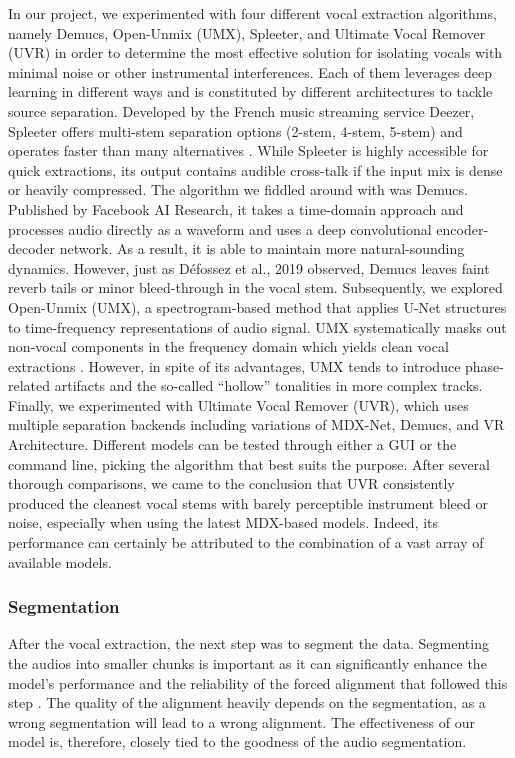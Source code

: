 \documentclass[a4paper]{article}
\begin{document}
	In our project, we experimented with four different vocal extraction algorithms, namely Demucs, Open-Unmix (UMX), Spleeter, and Ultimate Vocal Remover (UVR) in order to determine the most effective solution for isolating vocals with minimal noise or other instrumental interferences. Each of them leverages deep learning in different ways and is constituted by different architectures to tackle source separation. 
Developed by the French music streaming service Deezer, Spleeter offers multi-stem separation options (2-stem, 4-stem, 5-stem) and operates faster than many alternatives \cite{Stoeter2020}. While Spleeter is highly accessible for quick extractions, its output contains audible cross-talk if the input mix is dense or heavily compressed. The algorithm we fiddled around with was Demucs. Published by Facebook AI Research, it takes a time-domain approach and processes audio directly as a waveform and uses a deep convolutional encoder-decoder network. As a result, it is able to maintain more natural-sounding dynamics. However, just as Défossez et al., 2019 observed, Demucs leaves faint reverb tails or minor bleed-through in the vocal stem. Subsequently, we explored Open-Unmix (UMX), a spectrogram-based method that applies U-Net structures to time-frequency representations of audio signal. UMX systematically masks out non-vocal components in the frequency domain which yields clean vocal extractions \cite{Stoeter2018}. However, in spite of its advantages, UMX tends to introduce phase-related artifacts and the so-called “hollow” tonalities in more complex tracks. Finally, we experimented with Ultimate Vocal Remover (UVR), which uses multiple separation backends including variations of MDX-Net, Demucs, and VR Architecture. Different models can be tested through either a GUI or the command line, picking the algorithm that best suits the purpose. After several thorough comparisons, we came to the conclusion that UVR consistently produced the cleanest vocal stems with barely perceptible instrument bleed or noise, especially when using the latest MDX-based models.  Indeed, its performance can certainly be attributed to the combination of a vast array of available models.

 	
	\subsubsection{Segmentation}
	After the vocal extraction, the next step was to segment the data. Segmenting the audios into smaller chunks is important as it can significantly enhance the model’s performance and the reliability of the forced alignment that followed this step \cite{Rybach2009}. The quality of the alignment heavily depends on the segmentation, as a wrong segmentation will lead to a wrong alignment. The effectiveness of our model is, therefore, closely tied to the goodness of the audio segmentation. 
	
\end{document}
